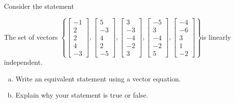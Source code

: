 
\begin{exerciseStatement}


Consider the statement 
\begin{center}\begin{minipage}{0.8\textwidth}
 The set of vectors \( \left\{ \left[\begin{array}{c}
-1 \\
2 \\
2 \\
4 \\
-3
\end{array}\right] , \left[\begin{array}{c}
5 \\
-3 \\
4 \\
2 \\
-5
\end{array}\right] , \left[\begin{array}{c}
3 \\
-3 \\
-4 \\
-2 \\
3
\end{array}\right] , \left[\begin{array}{c}
-5 \\
3 \\
-4 \\
-2 \\
5
\end{array}\right] , \left[\begin{array}{c}
-4 \\
-6 \\
3 \\
1 \\
-2
\end{array}\right] \right\} \)is linearly independent.
\end{minipage}\end{center}
    


\begin{enumerate}[(a)]
\item  Write an equivalent statement using a vector equation.
\item  Explain why your statement is true or false.
\end{enumerate}
    
\end{exerciseStatement}
    
